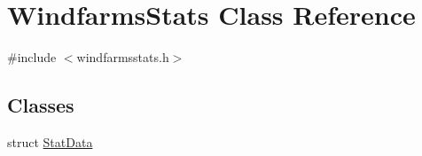 \hypertarget{class_windfarms_stats}{}\section{Windfarms\+Stats Class Reference}
\label{class_windfarms_stats}


{\ttfamily \#include $<$windfarmsstats.\+h$>$}

\subsection*{Classes}
\begin{DoxyCompactItemize}
\item 
struct \mbox{\hyperlink{struct_windfarms_stats_1_1_stat_data}{Stat\+Data}}
\end{DoxyCompactItemize}
